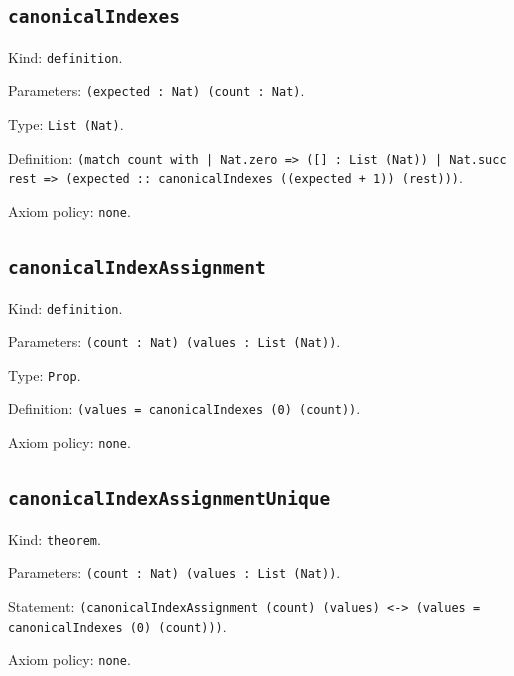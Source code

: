 \documentclass[11pt]{article}
\begin{document}
\subsection*{\texttt{canonicalIndexes}}
\noindent Kind: \texttt{definition}.\par
\noindent Parameters: \texttt{(expected : Nat) (count : Nat)}.\par
\noindent Type: \texttt{List (Nat)}.\par
\noindent Definition: \texttt{(match count with | Nat.zero => ([] : List (Nat)) | Nat.succ rest => (expected :: canonicalIndexes ((expected + 1)) (rest)))}.\par
\noindent Axiom policy: \texttt{none}.\par
\subsection*{\texttt{canonicalIndexAssignment}}
\noindent Kind: \texttt{definition}.\par
\noindent Parameters: \texttt{(count : Nat) (values : List (Nat))}.\par
\noindent Type: \texttt{Prop}.\par
\noindent Definition: \texttt{(values = canonicalIndexes (0) (count))}.\par
\noindent Axiom policy: \texttt{none}.\par
\subsection*{\texttt{canonicalIndexAssignmentUnique}}
\noindent Kind: \texttt{theorem}.\par
\noindent Parameters: \texttt{(count : Nat) (values : List (Nat))}.\par
\noindent Statement: \texttt{(canonicalIndexAssignment (count) (values) <-> (values = canonicalIndexes (0) (count)))}.\par
\noindent Axiom policy: \texttt{none}.\par
\end{document}
